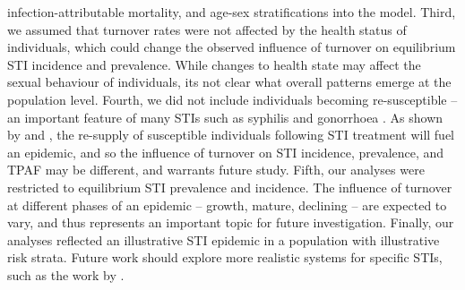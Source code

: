 infection-attributable mortality, and age-sex stratifications into the model.
Third, we assumed that turnover rates were not affected by
the health status of individuals,
which could change the observed influence of turnover on
equilibrium STI incidence and prevalence.
While changes to health state may affect the sexual behaviour of individuals,
its not clear what overall patterns emerge at the population level.
Fourth, we did not include individuals becoming re-susceptible
-- an important feature of many STIs such as syphilis and gonorrhoea
\citep{Fenton2008}.
As shown by \citet{Fenton2008} and \citet{Pourbohloul2003},
the re-supply of susceptible individuals following STI treatment
will fuel an epidemic, and so the influence of turnover on
STI incidence, prevalence, and TPAF may be different, and warrants future study.
Fifth, our analyses were restricted to
equilibrium STI prevalence and incidence.
The influence of turnover at different phases of an epidemic
-- growth, mature, declining --
are expected to vary, and thus represents an important topic for future investigation.
Finally, our analyses reflected an illustrative STI epidemic
in a population with illustrative risk strata.
Future work should explore more realistic systems for specific STIs,
such as the work by \citet{Johnson2016}.
